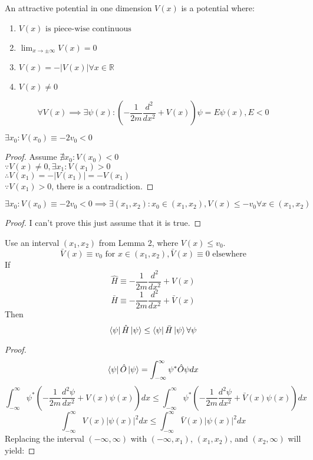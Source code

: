 \newpage
\begin{sol}
\begin{theorem}
An attractive potential in one dimension $V(x)$ is a potential where:
\begin{enumerate}
\item $V(x) \text{ is piece-wise continuous}$
\item $\lim_{x\to\pm\infty}V(x)=0$
\item $V(x)=-|V(x)|\forall x\in\mathbb{R}$
\item $V(x)\neq 0$ 
\end{enumerate}
$$\forall V(x)\implies \exists\psi(x):\left(-\frac{1}{2m}\frac{d^2}{dx^2}+V(x)\right)\psi=E\psi(x), E<0$$
\end{theorem}
\begin{lemma}
$\exists x_0:V(x_0)\equiv -2v_0<0$ 
\end{lemma}
\begin{proof}
Assume $\nexists x_0:V(x_0)<0$\\
$\because V(x)\neq 0, \exists x_1:V(x_1)>0$ \\
$\therefore V(x_1)=-|V(x_1)|=-V(x_1)$\\
$\because V(x_1)>0$, there is a contradiction.
\end{proof}
\begin{lemma}
$\exists x_0:V(x_0)\equiv -2v_0<0\implies\exists (x_1, x_2):x_0\in (x_1, x_2),V(x)\leq -v_0\forall x\in(x_1, x_2)$ 
\end{lemma}
\begin{proof}
I can't prove this just assume that it is true.
\end{proof}
\begin{lemma}
Use an interval $(x_1,x_2)$ from Lemma 2, where $V(x)\leq v_0$.
$$\bar{V}(x)\equiv v_0 \text{ for } x\in(x_1,x_2),\bar{V}(x)\equiv 0 \text{ elsewhere}$$
If
$$\hat{H}\equiv -\frac{1}{2m}\frac{d^2}{dx^2}+V(x)$$
$$\bar{H}\equiv -\frac{1}{2m}\frac{d^2}{dx^2}+\bar V(x)$$
Then
$$\bra\psi\hat H\ket\psi\leq\bra\psi\bar H\ket\psi\forall\psi$$
\end{lemma}
\begin{proof}
$$\bra\psi\hat O\ket\psi=\int_{-\infty}^\infty\psi^*\hat O\psi dx$$
$$\int_{-\infty}^\infty\psi^*\left(-\frac{1}{2m}\frac{d^2\psi}{dx^2}+V(x)\psi(x)\right)dx\leq\int_{-\infty}^\infty\psi^*\left(-\frac{1}{2m}\frac{d^2\psi}{dx^2}+\bar V(x)\psi(x)\right)dx$$
$$\int_{-\infty}^\infty V(x)|\psi(x)|^2dx\leq\int_{-\infty}^\infty\bar V(x)|\psi(x)|^2dx$$
Replacing the interval $(-\infty,\infty)$ with $(-\infty,x_1)$, $(x_1,x_2)$, and $(x_2, \infty)$ will yield:


\end{proof}
\end{sol}
